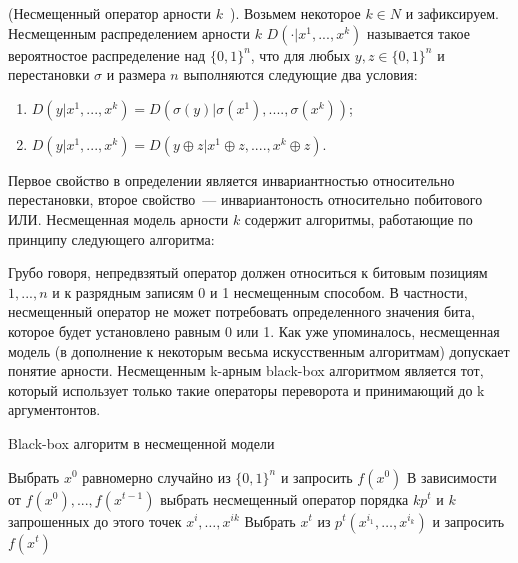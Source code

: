 

\begin{definition}
(Несмещенный оператор арности $k$~\cite{1}). Возьмем некоторое $k \in  N$ и зафиксируем. Несмещенным распределением арности $k$ $D(\cdot | x^{1}, ..., x^k)$  называется такое вероятностое распределение 
над $\{0, 1\}^{n}$, что для любых $y,z \in \{0, 1 \}^n$ и перестановки $\sigma$ и размера $n$ выполняются следующие два условия:
\begin{enumerate}
\item $D ( y | x^{1},..., x^{k} ) = D(\sigma(y) | \sigma(x^{1}),...., \sigma(x^{k}))$;
\item $D ( y | x^{1},..., x^{k} ) = D(y \oplus z | x^{1} \oplus z,...., x^{k} \oplus z)$. 
\end{enumerate}
\end{definition}

Первое свойство в определении является инвариантностью относительно перестановки, второе свойство~--- инвариантоность относительно побитового ИЛИ. Несмещенная модель арности $k$ содержит алгоритмы, 
работающие по принципу следующего алгоритма:


Грубо говоря, непредвзятый оператор должен относиться к битовым позициям $1, ..., n$ и к разрядным записям 0 и 1 несмещенным способом. В частности, несмещенный оператор не может потребовать определенного значения бита, которое будет установлено равным 0 или 1. Как уже упоминалось, несмещенная модель (в дополнение к некоторым весьма искусственным алгоритмам) допускает понятие арности. Несмещенным k-арным black-box алгоритмом является тот, который использует только такие операторы переворота и  принимающий до k аргументонтов.


\begin{algorithm}[H]
\caption{Black-box алгоритм в несмещенной модели}\label{lst1}
\begin{algorithmic}
        \State Выбрать $x^0$ равномерно случайно из $\{0,1\}^n$ и запросить $f(x^0)$  
	    \State В зависимости от $f(x^0),...,f(x^{t-1})$ выбрать несмещенный оператор порядка $k p^t$ и $k$ запрошенных до этого точек $x^i,\ldots,x^{ik}$
	    \State Выбрать $x^t$ из $p^{t} (x^{i_1},\ldots,x^{i_k})$ и запросить $f(x^t)$
		\EndFor
\end{algorithmic}
\end{algorithm}

